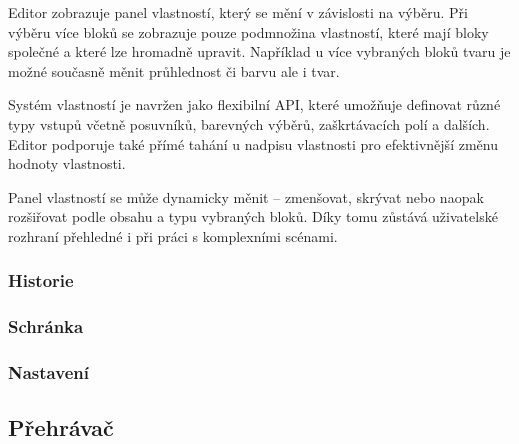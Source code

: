 Editor zobrazuje panel vlastností, který se mění v závislosti na výběru. 
Při výběru více bloků se zobrazuje pouze podmnožina vlastností, které mají bloky společné a které lze hromadně upravit. 
Například u více vybraných bloků tvaru je možné současně měnit průhlednost či barvu ale i tvar.

Systém vlastností je navržen jako flexibilní API, které umožňuje definovat různé typy vstupů včetně posuvníků, barevných výběrů, zaškrtávacích polí a dalších. 
Editor podporuje také přímé tahání u nadpisu vlastnosti pro efektivnější změnu hodnoty vlastnosti.

Panel vlastností se může dynamicky měnit -- zmenšovat, skrývat nebo naopak rozšiřovat podle obsahu a typu vybraných bloků. 
Díky tomu zůstává uživatelské rozhraní přehledné i při práci s komplexními scénami.







\subsubsection{Historie}
\subsubsection{Schránka}
\subsubsection{Nastavení}

\subsection{Přehrávač}
